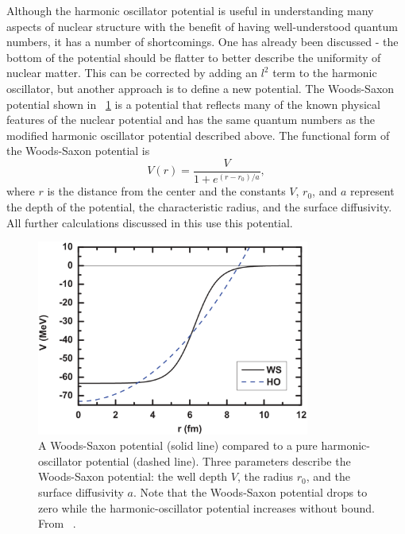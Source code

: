 Although the harmonic oscillator potential is useful in understanding many aspects of nuclear structure with the benefit of having well-understood quantum numbers, it has a number of shortcomings.  One has already been discussed - the bottom of the potential should be flatter to better describe the uniformity of nuclear matter.  This can be corrected by adding an $l^2$ term to the harmonic oscillator, but another approach is to define a new potential.  The Woods-Saxon potential \citep{WoodsSaxon} shown in {\fig}~\ref{fig:woodsSaxon} is a potential that reflects many of the known physical features of the nuclear potential and has the same quantum numbers as the modified harmonic oscillator potential described above.  The functional form of the Woods-Saxon potential is 
\begin{equation}
V(r) = \frac{V}{1+e^{(r-r_0)/a}},
\end{equation}
where $r$ is the distance from the center and the constants $V$, $r_0$, and $a$ represent the depth of the potential, the characteristic radius, and the surface diffusivity.  All further calculations discussed in this use this potential.
\begin{figure}[hp]
\centering
\includegraphics[width=0.8\textwidth]{figures/woodsSaxonVSharmonicOsc.eps}
\caption[The Woods-Saxon nuclear potential.]{A Woods-Saxon potential (solid line) compared to a pure harmonic-oscillator potential (dashed line).  Three parameters describe the Woods-Saxon potential: the well depth $V$, the radius $r_0$, and the surface diffusivity $a$.  Note that the Woods-Saxon potential drops to zero while the harmonic-oscillator potential increases without bound.  From {}~\citep{pseudospinSymmetry}.}
\label{fig:woodsSaxon}
\end{figure}

